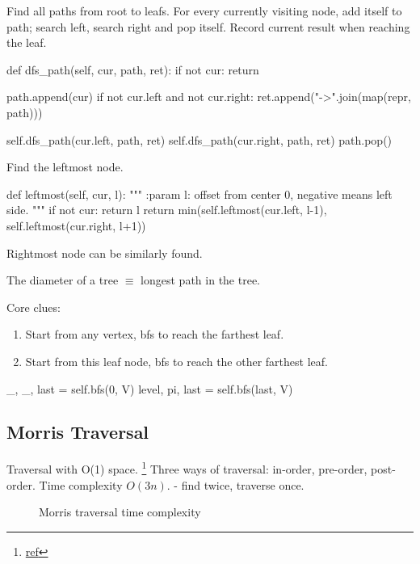  Find all paths from root to leafs. For every currently visiting node, add itself to path; search left, search right and pop itself. Record current result when reaching the leaf.
\begin{python}
def dfs_path(self, cur, path, ret):
    if not cur: return

    path.append(cur)
    if not cur.left and not cur.right:
        ret.append("->".join(map(repr, path)))

    self.dfs_path(cur.left, path, ret)
    self.dfs_path(cur.right, path, ret)
    path.pop()
\end{python}

 Find the leftmost node. 
\begin{python}
def leftmost(self, cur, l):
    """
    :param l: offset from center 0, negative means left side. 
    """
    if not cur: return l
    return min(self.leftmost(cur.left, l-1), 
               self.leftmost(cur.right, l+1))
\end{python}

Rightmost node can be similarly found.

 The diameter of a tree $\equiv$ longest path in the tree.

Core clues:
\begin{enumerate}
\item Start from any vertex, bfs to reach the farthest leaf.
\item Start from this leaf node, bfs to reach the other farthest leaf. 
\end{enumerate}
\begin{python}
_, _, last = self.bfs(0, V)
level, pi, last = self.bfs(last, V)
\end{python}

\subsection{Morris Traversal} 
Traversal with O(1) space. \footnote{\href{http://www.cnblogs.com/AnnieKim/archive/2013/06/15/MorrisTraversal.html}{ref}}
Three ways of traversal: in-order, pre-order, post-order.
Time complexity $O(3n).$ - find  twice,  traverse once.
\begin{figure}[hbtp]
\centering
{}
\caption{Morris traversal time complexity}
\label{fig:morrisTime}
\end{figure}

